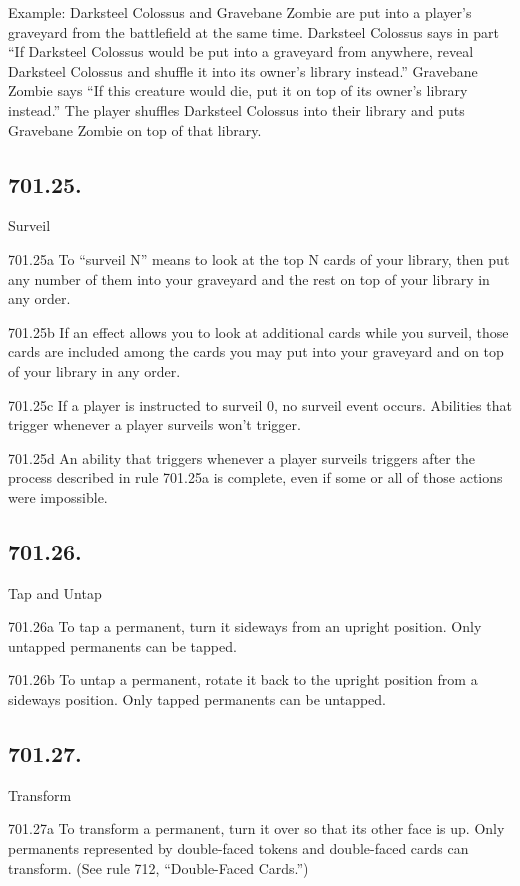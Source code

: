 Example: Darksteel Colossus and Gravebane Zombie are put into a player’s graveyard from the battlefield at the same time. Darksteel Colossus says in part “If Darksteel Colossus would be put into a graveyard from anywhere, reveal Darksteel Colossus and shuffle it into its owner’s library instead.” Gravebane Zombie says “If this creature would die, put it on top of its owner’s library instead.” The player shuffles Darksteel Colossus into their library and puts Gravebane Zombie on top of that library.

\subsection*{701.25.}
Surveil

701.25a To “surveil N” means to look at the top N cards of your library, then put any number of them into your graveyard and the rest on top of your library in any order.

701.25b If an effect allows you to look at additional cards while you surveil, those cards are included among the cards you may put into your graveyard and on top of your library in any order.

701.25c If a player is instructed to surveil 0, no surveil event occurs. Abilities that trigger whenever a player surveils won’t trigger.

701.25d An ability that triggers whenever a player surveils triggers after the process described in rule 701.25a is complete, even if some or all of those actions were impossible.

\subsection*{701.26.}
Tap and Untap

701.26a To tap a permanent, turn it sideways from an upright position. Only untapped permanents can be tapped.

701.26b To untap a permanent, rotate it back to the upright position from a sideways position. Only tapped permanents can be untapped.

\subsection*{701.27.}
Transform

701.27a To transform a permanent, turn it over so that its other face is up. Only permanents represented by double-faced tokens and double-faced cards can transform. (See rule 712, “Double-Faced Cards.”)

